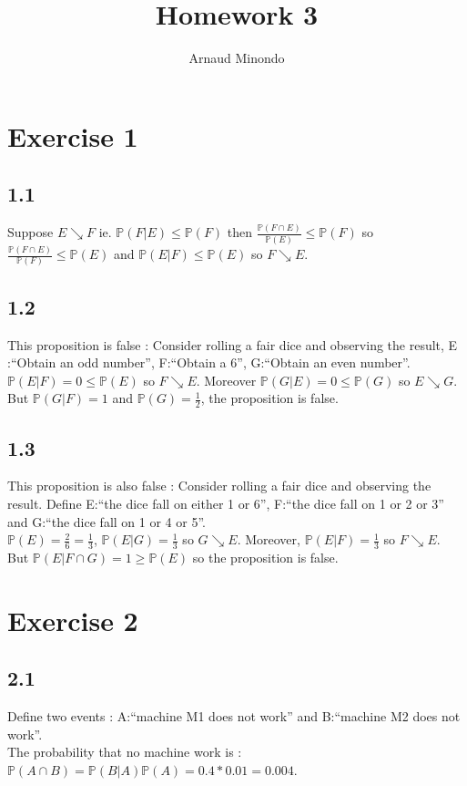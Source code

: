 \documentclass{article}
\title{Homework 3}
\author{Arnaud Minondo}
\begin{document}
\maketitle
\section*{Exercise 1}
\subsection*{1.1}
Suppose $E\searrow F$  ie. $\mathbb{P}(F|E)\leq \mathbb{P}(F)$ then $\frac{\mathbb{P}(F\cap E)}{\mathbb{P}(E)}\leq \mathbb{P}(F)$ so $\frac{\mathbb{P}(F \cap E)}{\mathbb{P}(F)}\leq \mathbb{P}(E)$ and $ \mathbb{P}(E|F)\leq\mathbb{P}(E)$ so $F\searrow E$.
\subsection*{1.2}
This proposition is false : Consider rolling a fair dice and observing the result, E :``Obtain an odd number'', F:``Obtain a 6'', G:``Obtain an even number''.
\\
$\mathbb{P}(E|F) = 0 \leq \mathbb{P}(E)$ so $F\searrow E$. Moreover $\mathbb{P}(G|E) = 0 \leq \mathbb{P}(G)$ so $E\searrow G$. But $\mathbb{P}(G|F) = 1$ and $\mathbb{P}(G)=\frac{1}{2}$, the proposition is false.
\subsection*{1.3}
This proposition is also false : 
Consider rolling a fair dice and observing the result.
 Define E:``the dice fall on either 1 or 6'', F:``the dice fall on 1 or 2 or 3'' and G:``the dice fall on 1 or 4 or 5''.
\\
 $\mathbb{P}(E) = \frac{2}{6} = \frac{1}{3}$, $\mathbb{P}(E|G) = \frac{1}{3}$ so $G\searrow E$. Moreover, $\mathbb{P}(E|F) = \frac{1}{3}$ so $F\searrow E$.
\\
But $\mathbb{P}(E|F\cap G) = 1\ge \mathbb{P}(E)$ so the proposition is false.
\section*{Exercise 2}
\subsection*{2.1}
Define two events : A:``machine M1 does not work'' and B:``machine M2 does not work''.
\\
The probability that no machine work is : $\mathbb{P}(A\cap B) = \mathbb{P}(B|A)\mathbb{P}(A) = 0.4*0.01 = 0.004$.
\\
\end{document}
